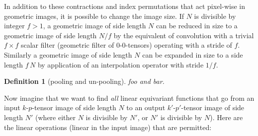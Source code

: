 \documentclass{article}
\theoremstyle{plain}
\newtheorem{definition}{Definition}
\begin{document}
In addition to these contractions and index permutations that act pixel-wise in geometric images, it is possible to change the image size.
If $N$ is divisible by integer $f>1$, a geometric image of side length $N$ can be reduced in size to a geometric image of side length $N/f$ by the equivalent of convolution with a trivial $f\times f$ scalar filter (geometric filter of 0-0-tensors) operating with a stride of $f$.
Similarly a geometric image of side length $N$ can be expanded in size to a side length $f\,N$ by application of an interpolation operator with stride $1/f$.
\begin{definition}[pooling and un-pooling]
foo and bar.
\end{definition}

Now imagine that we want to find \emph{all} linear equivariant functions that go from an input $k$-$p$-tensor image of side length $N$ to an output $k'$-$p'$-tensor image of side length $N'$ (where either $N$ is divisible by $N'$, or $N'$ is divisible by $N$).
Here are the linear operations (linear in the input image) that are permitted:
\end{document}
